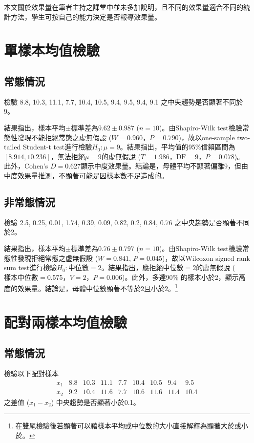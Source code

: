 \documentclass[12pt]{article}
\begin{document}
本文關於效果量在筆者主持之課堂中並未多加說明，且不同的效果量適合不同的統計方法，學生可按自己的能力決定是否報導效果量。


\section{單樣本均值檢驗}
\subsection{常態情況}
檢驗 8.8, 10.3, 11.1, 7.7, 10.4, 10.5, 9.4, 9.5, 9.4, 9.1 之中央趨勢是否顯著不同於9。

結果指出，樣本平均$\pm$標準差為$9.62 \pm 0.987$ ($n = 10$)。由Shapiro-Wilk test檢驗常態性發現不能拒絕常態之虚無假設 ($W = 0.960$，$P = 0.790$)，故以one-sample two-tailed Student-t test進行檢驗$H_0: \mu=9$。結果指出，平均值的95\%信賴區間為$\left[8.914, 10.236\right]$，無法拒絕$\mu = 9$的虚無假說 ($T = 1.986$，$\text{DF} = 9$，$P = 0.078$)。此外，Cohen's $D = 0.627$顯示中度效果量。結論是，母體平均不顯著偏離9，但由中度效果量推測，不顯著可能是因樣本數不足造成的。

\subsection{非常態情況}
檢驗 2.5, 0.25, 0.01, 1.74, 0.39, 0.09, 0.82, 0.2, 0.84, 0.76 之中央趨勢是否顯著不同於2。

結果指出，樣本平均$\pm$標準差為$0.76 \pm 0.797$ ($n = 10$)。由Shapiro-Wilk test檢驗常態性發現拒絕常態之虚無假設 ($W = 0.841$, $P = 0.045$)，故以Wilcoxon signed rank sum test進行檢驗$H_0: \text{中位數}=2$。結果指出，應拒絕中位數$=2$的虚無假說 ($\text{樣本中位數}=0.575$，$V = 2$，$P = 0.006$)。此外，多達90\% 的樣本小於2，顯示高度的效果量。結論是，母體中位數顯著不等於2且小於2。\footnote{在雙尾檢驗後若顯著可以藉樣本平均或中位數的大小直接解釋為顯著大於或小於。}

\section{配對兩樣本均值檢驗}
\subsection{常態情況}
檢驗以下配對樣本
\[
\begin{matrix}
x_1 & 8.8 & 10.3 & 11.1 & 7.7 &10.4 & 10.5 & 9.4 & 9.5 \\
x_2 & 9.2 & 10.4 & 11.6 & 7.7 & 10.6 & 11.6 & 11.4 & 10.4
\end{matrix}
\]
之差值 ($x_1 - x_2$) 中央趨勢是否顯著小於0.1。
\end{document}
